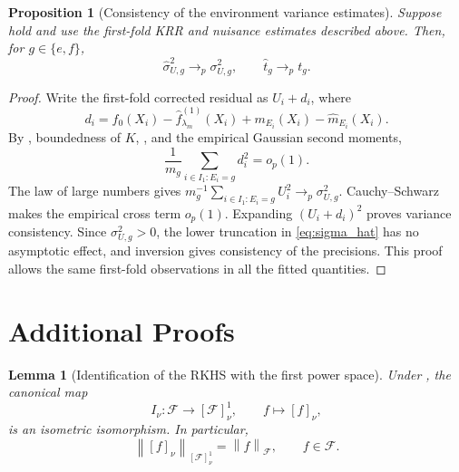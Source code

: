 \documentclass[11pt]{article}
\newtheorem{proposition}{Proposition}[section]
\newtheorem{lemma}{Lemma}[section]
\newcommand{\F}{\mathcal{F}}
\newcommand{\norm}[1]{\left\lVert #1\right\rVert}
\begin{document}
\begin{proposition}[Consistency of the environment variance estimates]\label{prop:noise_variances}
Suppose  hold and use the first-fold KRR and nuisance estimates described above. Then, for $g\in\{e,f\}$,
\[
 \widehat\sigma_{U,g}^2\to_p\sigma_{U,g}^2,\qquad \widehat t_g\to_p t_g.
\]
\end{proposition}
\begin{proof}
Write the first-fold corrected residual as $U_i+d_i$, where
\[
 d_i=f_0(X_i)-\widehat f_{\lambda_m}^{(1)}(X_i)
 +m_{E_i}(X_i)-\widehat m_{E_i}(X_i).
\]
By , boundedness of $K$, , and the empirical Gaussian second moments,
\[
 \frac1{m_g}\sum_{i\in I_1:E_i=g}d_i^2=o_p(1).
\]
The law of large numbers gives $m_g^{-1}\sum_{i\in I_1:E_i=g}U_i^2\to_p\sigma_{U,g}^2$. Cauchy--Schwarz makes the empirical cross term $o_p(1)$. Expanding $(U_i+d_i)^2$ proves variance consistency. Since $\sigma_{U,g}^2>0$, the lower truncation in \eqref{eq:sigma_hat} has no asymptotic effect, and inversion gives consistency of the precisions. This proof allows the same first-fold observations in all the fitted quantities.
\end{proof}

\newpage
\section{Additional Proofs}\label{sec:additional_proofs}

\begin{lemma}[Identification of the RKHS with the first power space]\label{lem:first_power_isometry}
Under , the canonical map
\[
  I_\nu:\F\to[\F]^1_\nu,\qquad f\mapsto[f]_\nu,
\]
is an isometric isomorphism. In particular,
\[
  \norm{[f]_\nu}_{[\F]^1_\nu}=\norm{f}_{\F},\qquad f\in\F.
\]
\end{lemma}
\end{document}
